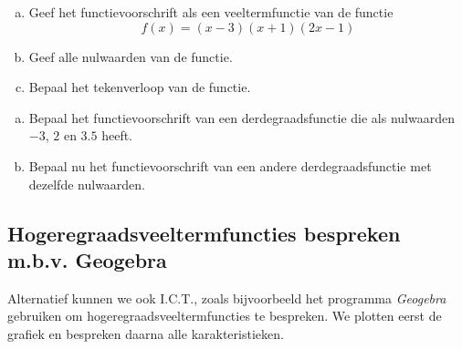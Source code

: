 \documentclass[12pt]{article}
\begin{document}
\begin{oefening}
\begin{enumerate}[(a)]
  \item Geef het functievoorschrift als een veeltermfunctie van de functie
$$f(x)=(x-3)(x+1)(2x-1)$$
  \item Geef alle nulwaarden van de functie.
  \item Bepaal het tekenverloop van de functie.
\end{enumerate}
\end{oefening}

\begin{oefening}
\begin{enumerate}[(a)]
  \item Bepaal het functievoorschrift van een derdegraadsfunctie die als nulwaarden $-3$, $2$ en $3.5$ heeft.
  \item Bepaal nu het functievoorschrift van een andere derdegraadsfunctie met dezelfde nulwaarden.
\end{enumerate}
\end{oefening}





\subsection{Hogeregraadsveeltermfuncties bespreken m.b.v. Geogebra}
Alternatief kunnen we ook I.C.T., zoals bijvoorbeeld het programma {\em Geogebra} gebruiken om hogeregraadsveeltermfuncties te bespreken. We plotten eerst de grafiek en bespreken daarna alle karakteristieken.
\end{document}
